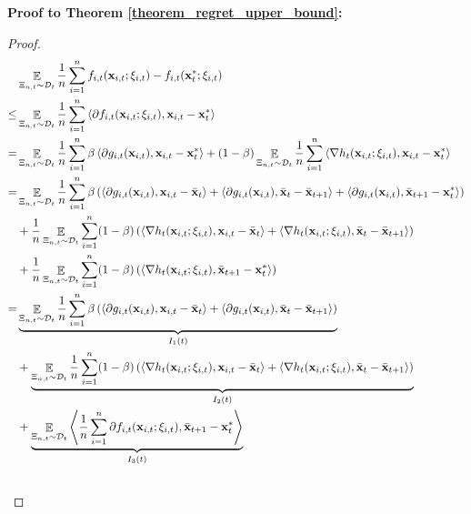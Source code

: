 \documentclass{article}
\begin{document}
\textbf{Proof to Theorem \ref{theorem_regret_upper_bound}:}
\begin{proof}
\begin{align}
\nonumber
& \mathop{\mathbb{E}}_{ \Xi_{n,t} \sim \mathcal{D}_{t} } \frac{1}{n}\sum_{i=1}^n f_{i,t}({\bf x}_{i,t};\xi_{i,t}) - f_{i,t}({\bf x}_t^\ast;\xi_{i,t}) \\ \nonumber
\le & \mathop{\mathbb{E}}_{ \Xi_{n,t} \sim \mathcal{D}_{t} } \frac{1}{n}\sum_{i=1}^n \left\langle \partial f_{i,t}({\bf x}_{i,t};\xi_{i,t}),  {\bf x}_{i,t} - {\bf x}_t^\ast  \right\rangle \\ \nonumber
= & \mathop{\mathbb{E}}_{ \Xi_{n,t} \sim \mathcal{D}_{t} }\frac{1}{n}\sum_{i=1}^n \beta \left\langle\partial g_{i,t}({\bf x}_{i,t}), {\bf x}_{i,t} - {\bf x}_t^\ast  \right\rangle + (1-\beta) \mathop{\mathbb{E}}_{ \Xi_{n,t} \sim \mathcal{D}_{t} } \frac{1}{n}\sum_{i=1}^n \left\langle\nabla h_t({\bf x}_{i,t};\xi_{i,t}), {\bf x}_{i,t} - {\bf x}_t^\ast  \right\rangle \\ \nonumber
 = & \mathop{\mathbb{E}}_{ \Xi_{n,t} \sim \mathcal{D}_{t} }\frac{1}{n}\sum_{i=1}^n \beta \left( \left\langle\partial g_{i,t}({\bf x}_{i,t}), {\bf x}_{i,t} - \bar{{\bf x}}_t  \right\rangle + \left\langle\partial g_{i,t}({\bf x}_{i,t}), \bar{{\bf x}}_t - \bar{{\bf x}}_{t+1} \right\rangle + \left\langle\partial g_{i,t}({\bf x}_{i,t}), \bar{{\bf x}}_{t+1} - {\bf x}_t^\ast   \right\rangle  \right) \\ \nonumber 
 & + \frac{1}{n}\mathop{\mathbb{E}}_{ \Xi_{n,t} \sim \mathcal{D}_{t} }\sum_{i=1}^n (1-\beta) \left(   \left\langle\nabla h_t({\bf x}_{i,t};\xi_{i,t}), {\bf x}_{i,t} - \bar{{\bf x}}_t  \right\rangle +  \left\langle\nabla h_t({\bf x}_{i,t};\xi_{i,t}), \bar{{\bf x}}_t - \bar{{\bf x}}_{t+1}  \right\rangle  \right) \\ \nonumber 
 & + \frac{1}{n}\mathop{\mathbb{E}}_{ \Xi_{n,t} \sim \mathcal{D}_{t} }\sum_{i=1}^n (1-\beta) \left(  \left\langle\nabla h_t({\bf x}_{i,t};\xi_{i,t}), \bar{{\bf x}}_{t+1} - {\bf x}_t^\ast  \right\rangle  \right)\\ \nonumber
= & \underbrace{ \mathop{\mathbb{E}}_{ \Xi_{n,t} \sim \mathcal{D}_{t} } \frac{1}{n}\sum_{i=1}^n \beta \left( \left\langle\partial g_{i,t}({\bf x}_{i,t}), {\bf x}_{i,t} - \bar{{\bf x}}_t  \right\rangle + \left\langle\partial g_{i,t}({\bf x}_{i,t}), \bar{{\bf x}}_t - \bar{{\bf x}}_{t+1}  \right\rangle  \right) }_{I_1(t)} \\ \nonumber 
 & + \underbrace{ \mathop{\mathbb{E}}_{ \Xi_{n,t} \sim \mathcal{D}_{t} } \frac{1}{n}\sum_{i=1}^n (1-\beta) \left(  \left\langle\nabla h_t({\bf x}_{i,t}; \xi_{i,t}), {\bf x}_{i,t} - \bar{{\bf x}}_t  \right\rangle +   \left\langle\nabla h_t({\bf x}_{i,t};\xi_{i,t}), \bar{{\bf x}}_t - \bar{{\bf x}}_{t+1}  \right\rangle \right) }_{I_2(t)}\\ \nonumber 
&+ \underbrace{ \mathop{\mathbb{E}}_{ \Xi_{n,t} \sim \mathcal{D}_{t} } \left\langle\frac{1}{n}\sum_{i=1}^n\partial f_{i,t}({\bf x}_{i,t};\xi_{i,t}), \bar{{\bf x}}_{t+1} - {\bf x}_t^\ast  \right\rangle }_{I_3(t)}\\ \nonumber
\end{align}


\end{proof}
\end{document}
